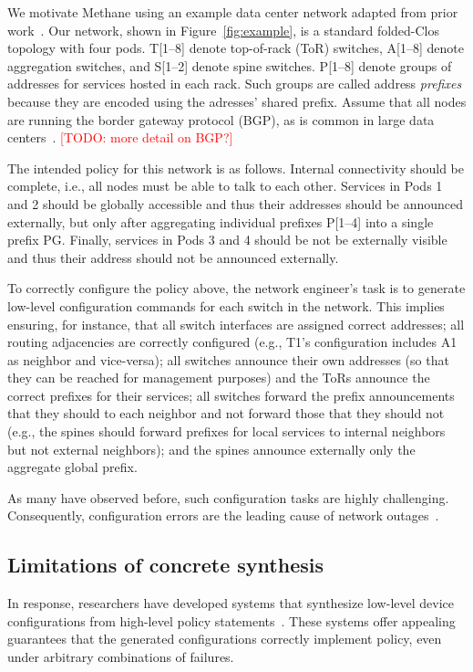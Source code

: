 \documentclass{sig-alternate-10pt}
\newcommand{\todo}[1]{\textcolor{red}{[TODO: #1]}}
\newcommand{\sysname}{{\small \sf Methane}\xspace}
\begin{document}
We motivate \sysname using an example data center network adapted from prior work~\cite{propane}. Our network, shown in Figure~\ref{fig:example}, is a standard folded-Clos topology with four pods. T[1--8] denote top-of-rack (ToR) switches, A[1--8] denote aggregation switches, and S[1--2] denote spine switches. P[1--8] denote groups of addresses for services hosted in each rack. Such groups are called address {\em prefixes} because they are encoded using the adresses' shared prefix. Assume that all nodes are running the border gateway protocol (BGP), as is common in large data centers~\cite{x}. \todo{more detail on BGP?}

The intended policy for this network is as follows. Internal connectivity should be complete, i.e., all nodes must be able to talk to each other. Services in Pods 1 and 2 should be globally accessible and thus their addresses should be announced externally, but only after aggregating individual prefixes P[1--4] into a single prefix PG. Finally, services in Pods 3 and 4 should be not be externally visible and thus their address should not be announced externally.

To correctly configure the policy above, the network engineer's task is to generate low-level configuration commands for each switch in the network. This implies ensuring, for instance, that all switch interfaces are assigned correct addresses; all routing adjacencies are correctly configured (e.g., T1's configuration includes A1 as neighbor and vice-versa); all switches announce their own addresses (so that they can be reached for management purposes) and the ToRs announce the correct prefixes for their services; all switches  forward the prefix announcements that they should to each neighbor and not forward those that they should not (e.g., the spines should forward prefixes for local services to internal neighbors but not external neighbors); and the spines announce externally only the aggregate global prefix.

As many have observed before, such configuration tasks are highly challenging. Consequently, configuration errors are the leading cause of network outages~\cite{x,y,z,batfish,propane}.

\subsection{Limitations of concrete synthesis}

In response, researchers have developed systems that synthesize low-level device configurations from high-level policy statements~\cite{x,y,propane}.
These systems offer appealing guarantees that the generated configurations correctly implement policy, even under arbitrary combinations of failures.
\end{document}
